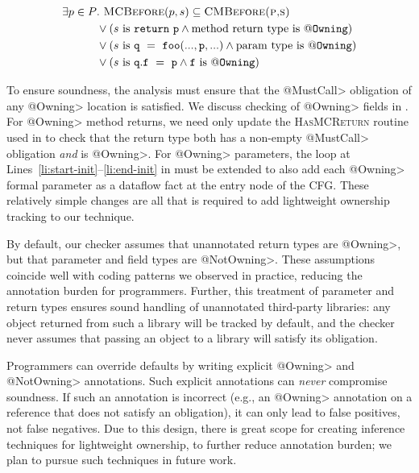 \begin{align*}
  \exists p \in P &.\ \textsc{MCBefore}(p,s) \subseteq \textsc{CMBefore(p,s)}\\
                  &\vee (s \mathrm{\ is\ } \mathtt{return\ p} \wedge \mathrm{method\ return\ type\ is\ } \mathtt{@Owning})\\
                  &\vee (s \mathrm{\ is\ } \mathtt{q\ =\ foo(...,p,...)} \wedge \mathrm{param\ type\ is\ } \mathtt{@Owning})\\
                  &\vee (s \mathrm{\ is\ } \mathtt{q.f\ =\ p} \wedge \mathtt{f} \mathrm{\ is\ } \mathtt{@Owning})\\
\end{align*}

To ensure soundness, the analysis must ensure that the \<@MustCall> obligation
of any \<@Owning> location is satisfied.  We discuss checking of \<@Owning>
fields in .  For \<@Owning> method returns, we need only
update the \textsc{Has\-MCReturn} routine used in  to check that
the return type both has a non-empty \<@MustCall> obligation \emph{and} is
\<@Owning>.  For \<@Owning> parameters, the loop at
Lines~\ref{li:start-init}--\ref{li:end-init} in 
must be extended to also add each \<@Owning> formal parameter as a dataflow
fact at the entry node of the CFG.  These relatively simple changes are all that
is required to add lightweight ownership tracking to our technique.

By default, our checker assumes that unannotated return types are \<@Owning>,
but that parameter and field types are \<@NotOwning>.  These assumptions
coincide well with coding patterns we observed in practice, reducing the
annotation burden for programmers.  Further, this treatment of parameter and
return types ensures sound handling of unannotated third-party libraries: any
object returned from such a library will be tracked by default, and the checker
never assumes that passing an object to a library will satisfy its obligation.

Programmers can override defaults by writing explicit \<@Owning> and
\<@NotOwning> annotations.  Such explicit annotations can \emph{never}
compromise soundness.  If such an annotation is incorrect (e.g., an \<@Owning>
annotation on a reference that does not satisfy an obligation), it can only lead
to false positives, not false negatives.  Due to this design, there is great
scope for creating inference techniques for lightweight ownership, to further
reduce annotation burden; we plan to pursue such techniques in future work.

